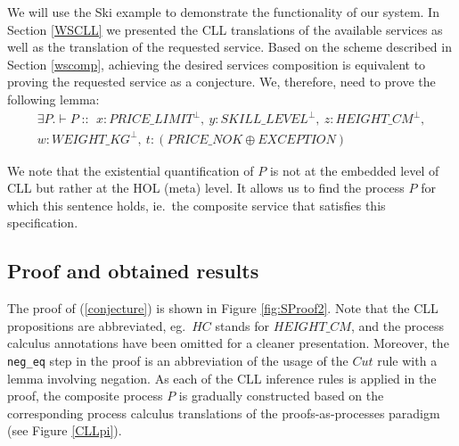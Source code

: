 \documentclass[copyright,creativecommons]{eptcs}
\DeclareMathOperator{\cc}{::\ }
\DeclareMathOperator{\cln}{:}
\begin{document}
We will use the Ski example to demonstrate the functionality of our system. In Section \ref{WSCLL} we presented the CLL translations of the available services as well as the translation of the requested service. Based on the scheme described in Section \ref{wscomp}, achieving the desired services composition is equivalent to proving the requested service as a conjecture. We, therefore, need to prove the following lemma:
\begin{equation}
\label{conjecture}
	\begin{aligned}
	\exists P. \vdash P \cc x \cln PRICE\_LIMIT^\bot,\ y \cln SKILL\_LEVEL^\bot,\ z \cln HEIGHT\_CM^\bot, \\
  w \cln WEIGHT\_KG^\bot,\ t \cln (PRICE\_NOK \oplus EXCEPTION)
	\end{aligned}	  
\end{equation}


We note that the existential quantification of $P$ is not at the embedded level of CLL but rather at the HOL (meta) level. It allows us to find the process $P$ for which this sentence holds, ie.\ the composite service that satisfies this specification.

\subsection{Proof and obtained results}
\label{resres}

The proof of (\ref{conjecture}) is shown in Figure \ref{fig:SProof2}. Note that the CLL propositions are abbreviated, eg.\ $HC$ stands for $HEIGHT\_CM$, and the process calculus annotations have been omitted for a cleaner presentation. Moreover, the \texttt{neg\_eq} step in the proof is an abbreviation of the usage of the $Cut$ rule with a lemma involving negation. As each of the CLL inference rules is applied in the proof, the composite process $P$ is gradually constructed based on the corresponding process calculus translations of the proofs-as-processes paradigm (see Figure \ref{CLLpi}). 
\end{document}
